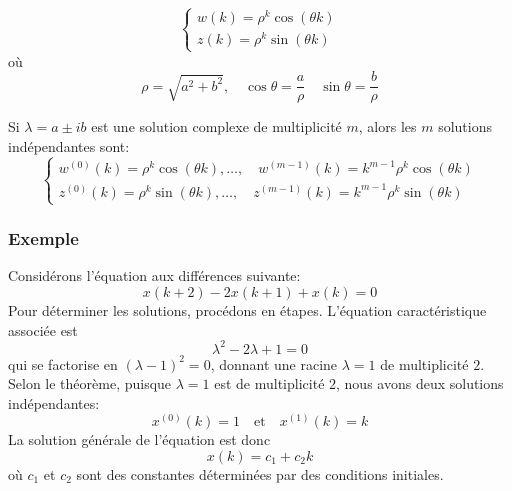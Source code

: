                 \begin{equation}
                    \begin{cases}
                        w(k) = \rho^k \cos(\theta k) \\ 
                        z(k) = \rho^k \sin(\theta k)
                    \end{cases}
                \end{equation}
                où 
                \begin{equation}
                    \rho = \sqrt{a^2+b^2}, \quad \cos \theta = \frac{a}{\rho} \quad \sin \theta = \frac{b}{\rho}
                \end{equation}
                
                Si $\lambda = a \pm ib$ est une solution complexe de multiplicité $m$, alors les $m$ solutions indépendantes sont:
                \begin{equation}
                    \begin{cases}
                        w^{(0)}(k) = \rho^k \cos(\theta k), \dots, \quad w^{(m-1)}(k) = k^{m-1} \rho^k \cos(\theta k) \\
                        z^{(0)}(k) = \rho^k \sin(\theta k), \dots, \quad z^{(m-1)}(k) = k^{m-1} \rho^k \sin(\theta k)
                    \end{cases}
                \end{equation}

            \subsubsection{Exemple}
                Considérons l'équation aux différences suivante:
                \begin{equation}
                    x(k+2)-2x(k+1)+x(k) = 0
                \end{equation}
                Pour déterminer les solutions, procédons en étapes.
                L'équation caractéristique associée est 
                \begin{equation}
                    \lambda^2-2\lambda+1 = 0
                \end{equation}
                qui se factorise en $(\lambda-1)^2 = 0$, donnant une racine $\lambda = 1$ de multiplicité $2$.
                Selon le théorème, puisque $\lambda = 1$ est de multiplicité $2$, nous avons deux solutions indépendantes:
                \begin{equation}
                    x^{(0)}(k) = 1 \quad \text{et} \quad x^{(1)}(k) = k
                \end{equation}
                La solution générale de l'équation est donc
                \begin{equation}
                    x(k) = c_1+c_2 k
                \end{equation}
                où $c_1$ et $c_2$ sont des constantes déterminées par des conditions initiales.
                
